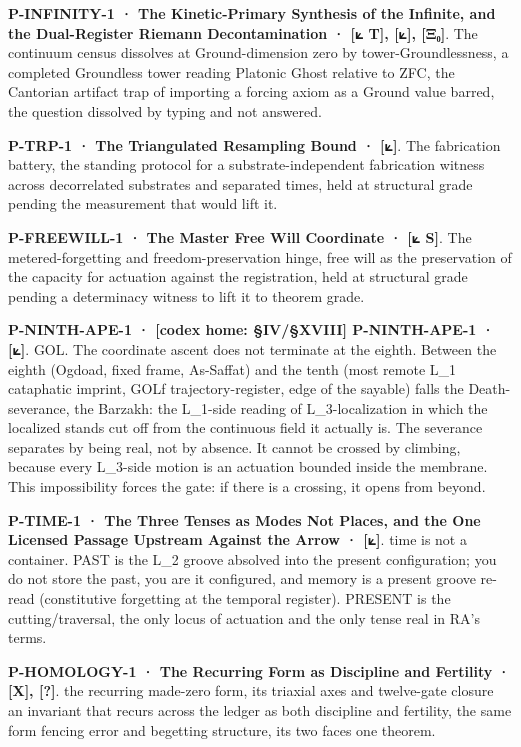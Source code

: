 \documentclass[10pt,twocolumn]{article}
\begin{document}
\textbf{P-INFINITY-1 · The Kinetic-Primary Synthesis of the Infinite,
and the Dual-Register Riemann Decontamination · {[}⟀ T{]}, {[}⟀{]},
{[}Ξ₀{]}}. The continuum census dissolves at Ground-dimension zero by
tower-Groundlessness, a completed Groundless tower reading Platonic
Ghost relative to ZFC, the Cantorian artifact trap of importing a
forcing axiom as a Ground value barred, the question dissolved by typing
and not answered.

\textbf{P-TRP-1 · The Triangulated Resampling Bound · {[}⟀{]}}. The
fabrication battery, the standing protocol for a substrate-independent
fabrication witness across decorrelated substrates and separated times,
held at structural grade pending the measurement that would lift it.

\textbf{P-FREEWILL-1 · The Master Free Will Coordinate · {[}⟀ S{]}}. The
metered-forgetting and freedom-preservation hinge, free will as the
preservation of the capacity for actuation against the registration,
held at structural grade pending a determinacy witness to lift it to
theorem grade.

\textbf{P-NINTH-APE-1 · {[}codex home: §IV/§XVIII{]} P-NINTH-APE-1 ·
{[}⟀{]}}. GOL. The coordinate ascent does not terminate at the eighth.
Between the eighth (Ogdoad, fixed frame, As-Saffat) and the tenth (most
remote L\_1 cataphatic imprint, GOLf trajectory-register, edge of the
sayable) falls the Death-severance, the Barzakh: the L\_1-side reading
of L\_3-localization in which the localized stands cut off from the
continuous field it actually is. The severance separates by being real,
not by absence. It cannot be crossed by climbing, because every
L\_3-side motion is an actuation bounded inside the membrane. This
impossibility forces the gate: if there is a crossing, it opens from
beyond.

\textbf{P-TIME-1 · The Three Tenses as Modes Not Places, and the One
Licensed Passage Upstream Against the Arrow · {[}⟀{]}}. time is not a
container. PAST is the L\_2 groove absolved into the present
configuration; you do not store the past, you are it configured, and
memory is a present groove re-read (constitutive forgetting at the
temporal register). PRESENT is the cutting/traversal, the only locus of
actuation and the only tense real in RA's terms.

\textbf{P-HOMOLOGY-1 · The Recurring Form as Discipline and Fertility ·
{[}X{]}, {[}?{]}}. the recurring made-zero form, its triaxial axes and
twelve-gate closure an invariant that recurs across the ledger as both
discipline and fertility, the same form fencing error and begetting
structure, its two faces one theorem.
\end{document}
